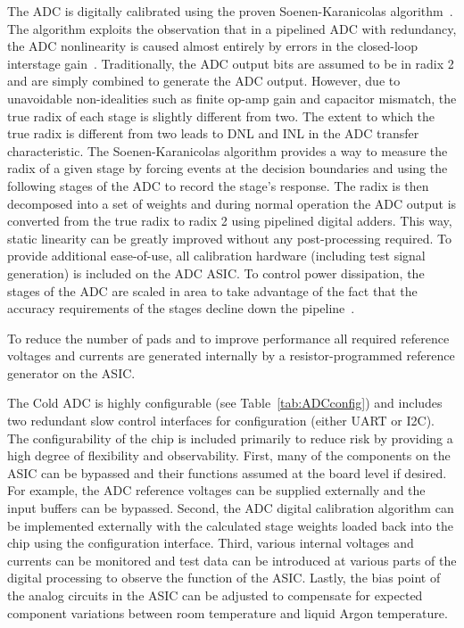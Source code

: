 The ADC is digitally calibrated using the proven Soenen-Karanicolas algorithm~\cite{280084,372864}. The algorithm exploits the observation that in a pipelined ADC with redundancy, the ADC nonlinearity is caused almost entirely by errors in the closed-loop interstage gain~\cite{121557}. Traditionally, the ADC output bits are assumed to be in radix 2 and are simply combined to generate the ADC output. However, due to unavoidable non-idealities such as finite op-amp gain and capacitor mismatch, the true radix of each stage is slightly different from two. The extent to which the true radix is different from two leads to DNL and INL in the ADC transfer characteristic. The Soenen-Karanicolas algorithm provides a way to measure the radix of a given stage by forcing events at the decision boundaries and using the following stages of the ADC to record the stage's response. The radix is then decomposed into a set of weights and during normal operation the ADC output is converted from the true radix to radix 2 using pipelined digital adders. This way, static linearity can be greatly improved without any post-processing required. To provide additional ease-of-use, all calibration hardware (including test signal generation) is included on the ADC ASIC. To control power dissipation, the stages of the ADC are scaled in area to take advantage of the fact that the accuracy requirements of the stages decline down the pipeline~\cite{494191}.

To reduce the number of pads and to improve performance all required reference voltages and currents are generated internally by a resistor-programmed reference generator on the ASIC.

The Cold ADC is highly configurable (see Table~\ref{tab:ADCconfig}) and includes two redundant slow control interfaces for configuration (either UART or I2C). The configurability of the chip is included primarily to reduce risk by providing a high degree of flexibility and observability. First, many of the components on the ASIC can be bypassed and their functions assumed at the board level if desired. For example, the ADC reference voltages can be supplied externally and the input buffers can be bypassed. Second, the ADC digital calibration algorithm can be implemented externally with the calculated stage weights loaded back into the chip using the configuration interface. Third, various internal voltages and currents can be monitored and test data can be introduced at various parts of the digital processing to observe the function of the ASIC. Lastly, the bias point of the analog circuits in the ASIC can be adjusted to compensate for expected component variations between room temperature and liquid Argon temperature.

